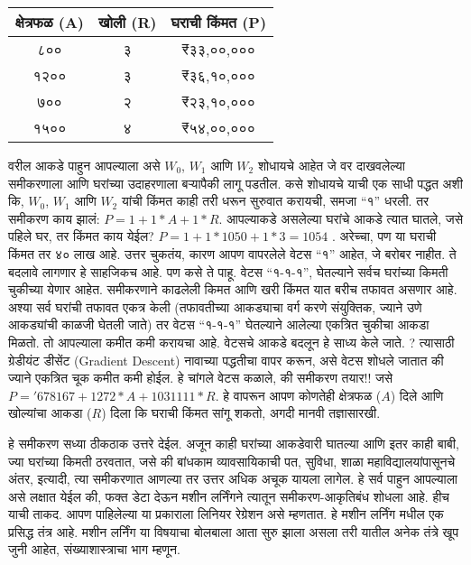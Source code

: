 \begin{table}[h!]
\centering
\begin{tabular}{|c|c|c|}
\hline
\textbf{क्षेत्रफळ (A)} & \textbf{खोली (R)} & \textbf{घराची किंमत (P)} \\
\hline
८०० & ३ & ₹३३,००,००० \\
१२०० & ३ & ₹३६,१०,००० \\
७०० & २ & ₹२३,१०,००० \\
१५०० & ४ & ₹५४,००,००० \\
\hline
\end{tabular}
\end{table}


वरील आकडे पाहुन आपल्याला असे $W_0$, $W_1$ आणि $W_2$ शोधायचे आहेत जे वर दाखवलेल्या समीकरणाला आणि घरांच्या उदाहरणाला बऱ्यापैकी लागू पडतील. कसे शोधायचे याची एक साधी पद्धत अशी कि, $W_0$, $W_1$ आणि $W_2$ यांची किंमत काही तरी धरून सुरुवात करायची, समजा ``१'' धरली. तर समीकरण काय झालं: $P = 1+ 1 *A + 1 *R$. आपल्याकडे असलेल्या घरांचे आकडे त्यात घातले, जसे पहिले घर, तर किंमत काय येईल? $P = 1+ 1 * 1050 + 1*3 = 1054$ . अरेच्चा, पण या घराची किंमत तर ४० लाख आहे. उत्तर चुकतंय, कारण आपण वापरलेले वेटस ``१'' आहेत, जे बरोबर नाहीत. ते बदलावे लागणार हे साहजिकच आहे. पण कसे ते पाहू. वेटस ``१-१-१'', घेतल्याने सर्वच घरांच्या किमती चुकीच्या येणार आहेत. समीकरणाने काढलेली किमत आणि खरी किंमत यात बरीच तफावत असणार आहे. अश्या सर्व घरांची तफावत एकत्र केली (तफावतीच्या आकड्याचा वर्ग करणे संयुक्तिक, ज्याने उणे आकड्यांची काळजी घेतली जाते) तर वेटस ``१-१-१'' घेतल्याने आलेल्या एकत्रित चुकीचा आकडा मिळतो. तो आपल्याला कमीत कमी करायचा आहे. वेटसचे आकडे बदलून हे साध्य केले जाते. ? त्यासाठी ग्रेडीयंट डीसेंट (Gradient Descent) नावाच्या पद्धतीचा वापर करून, असे वेटस शोधले जातात की ज्याने एकत्रित चूक कमीत कमी होईल. हे चांगले वेटस कळाले, की समीकरण तयार!! जसे $P = '678167 + 1272 * A + 1031111 * R$. हे वापरून आपण कोणतेही क्षेत्रफळ ($A$) दिले आणि खोल्यांचा आकडा ($R$) दिला कि घराची किंमत सांगू शकतो, अगदी मानवी तज्ञासारखी.

हे समीकरण सध्या ठीकठाक उत्तरे देईल. अजून काही घरांच्या आकडेवारी घातल्या आणि इतर काही बाबी, ज्या घरांच्या किमती ठरवतात, जसे की बांधकाम व्यावसायिकाची पत, सुविधा, शाळा महाविद्यालयांपासूनचे अंतर, इत्यादी, त्या समीकरणात आणल्या तर उत्तर अधिक अचूक यायला लागेल. हे सर्व पाहुन आपल्याला असे लक्षात येईल की, फक्त डेटा देऊन मशीन लर्निंगने त्यातून समीकरण-आकृतिबंध शोधला आहे. हीच याची ताकद. आपण पाहिलेल्या या प्रकाराला लिनियर रेग्रेशन असे म्हणतात. हे मशीन लर्निंग मधील एक प्रसिद्ध तंत्र आहे. मशीन लर्निंग या विषयाचा बोलबाला आता सुरु झाला असला तरी यातील अनेक तंत्रे खूप जुनी आहेत, संख्याशास्त्राचा भाग म्हणून.

